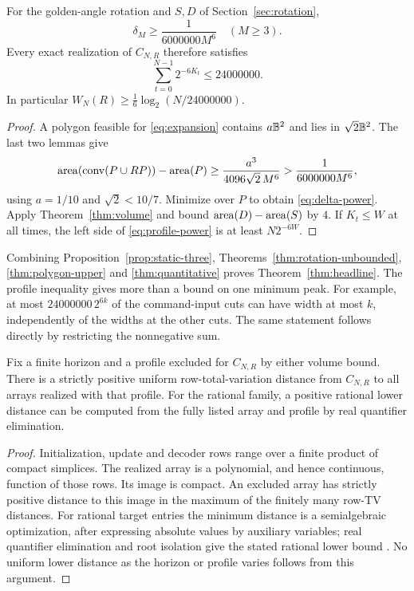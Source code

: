 \begin{theorem}\label{thm:quantitative}
For the golden-angle rotation and $S,D$ of Section~\ref{sec:rotation},
\begin{equation}\label{eq:delta-power}
                   \delta_M\ge\frac{1}{6000000M^6}\quad(M\ge3).
\end{equation}
Every exact realization of $C_{N,R}$ therefore satisfies
\begin{equation}\label{eq:profile-power}
                    \sum_{t=0}^{N-1}2^{-6K_t}\le24000000.
\end{equation}
In particular $W_N(R)\ge\frac16\log_2(N/24000000)$.
\end{theorem}
\begin{proof}
A polygon feasible for \eqref{eq:expansion} contains $a\mathbb B^2$ and lies
in $\sqrt2\mathbb B^2$. The last two lemmas give
\[
 \operatorname{area}(\operatorname{conv}(P\cup RP)) -\operatorname{area}(P)
 \ge\frac{a^3}{4096\sqrt2\,M^6}
 >\frac{1}{6000000M^6},
\]
using $a=1/10$ and $\sqrt2<10/7$. Minimize over $P$ to obtain
\eqref{eq:delta-power}. Apply Theorem~\ref{thm:volume} and bound
$\operatorname{area}(D)-\operatorname{area}(S)$ by $4$. If $K_t\le W$ at all times, the left
side of \eqref{eq:profile-power} is at least $N2^{-6W}$.
\end{proof}

Combining Proposition~\ref{prop:static-three},
Theorems~\ref{thm:rotation-unbounded}, \ref{thm:polygon-upper} and
\ref{thm:quantitative} proves Theorem~\ref{thm:headline}.
The profile inequality gives more than a bound on one minimum peak.
For example, at most $24000000\,2^{6k}$ of the command-input cuts can
have width at most $k$, independently of the widths at the other cuts.
The same statement follows directly by restricting the nonnegative sum.

\begin{proposition}
\label{prop:robust-profile}
Fix a finite horizon and a profile excluded for $C_{N,R}$ by either
volume bound. There is a strictly positive uniform row-total-variation
distance from $C_{N,R}$ to all arrays realized with that profile. For the
rational family, a positive rational lower distance can be computed from
the fully listed array and profile by real quantifier elimination.
\end{proposition}
\begin{proof}
Initialization, update and decoder rows range over a finite product of
compact simplices. The realized array is a polynomial, and hence
continuous, function of those rows. Its image is compact. An excluded
array has strictly positive distance to this image in the maximum of
the finitely many row-TV distances. For rational target entries the
minimum distance is a semialgebraic optimization, after expressing
absolute values by auxiliary variables; real quantifier elimination
and root isolation give the stated rational lower bound \cite{BPR}.
No uniform lower distance as the horizon or profile varies follows from
this argument.
\end{proof}

